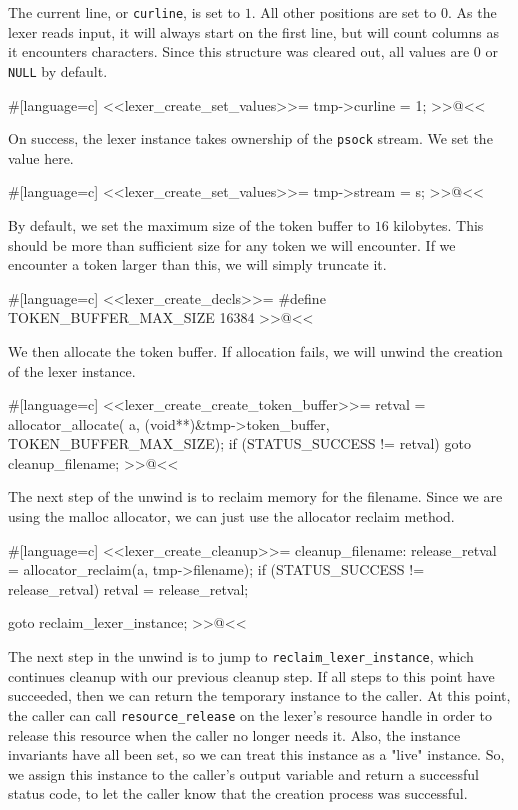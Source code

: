 {The current line, or \verb/curline/, is set to $1$. All other positions are
set to $0$. As the lexer reads input, it will always start on the first line,
but will count columns as it encounters characters. Since this structure was
cleared out, all values are $0$ or \verb/NULL/ by default.

#[language=c]
<<lexer_create_set_values>>=
    tmp->curline = 1;
>>@<<

On success, the lexer instance takes ownership of the \verb/psock/ stream. We
set the value here.

#[language=c]
<<lexer_create_set_values>>=
    tmp->stream = s;
>>@<<

By default, we set the maximum size of the token buffer to $16$ kilobytes.
This should be more than sufficient size for any token we will encounter. If we
encounter a token larger than this, we will simply truncate it.

#[language=c]
<<lexer_create_decls>>=
#define TOKEN_BUFFER_MAX_SIZE   16384
>>@<<

We then allocate the token buffer. If allocation fails, we will unwind the
creation of the lexer instance.

#[language=c]
<<lexer_create_create_token_buffer>>=
    retval =
        allocator_allocate(
            a, (void**)&tmp->token_buffer, TOKEN_BUFFER_MAX_SIZE);
    if (STATUS_SUCCESS != retval)
    {
        goto cleanup_filename;
    }
>>@<<

The next step of the unwind is to reclaim memory for the filename. Since we are
using the malloc allocator, we can just use the allocator reclaim method.

#[language=c]
<<lexer_create_cleanup>>=
cleanup_filename:
    release_retval = allocator_reclaim(a, tmp->filename);
    if (STATUS_SUCCESS != release_retval)
    {
        retval = release_retval;
    }

    goto reclaim_lexer_instance;
>>@<<

The next step in the unwind is to jump to \verb/reclaim_lexer_instance/, which
continues cleanup with our previous cleanup step. If all steps to this point
have succeeded, then we can return the temporary instance to the caller. At this
point, the caller can call \verb/resource_release/ on the lexer's resource
handle in order to release this resource when the caller no longer needs it.
Also, the instance invariants have all been set, so we can treat this instance
as a "live" instance. So, we assign this instance to the caller's output
variable and return a successful status code, to let the caller know that the
creation process was successful.

}
